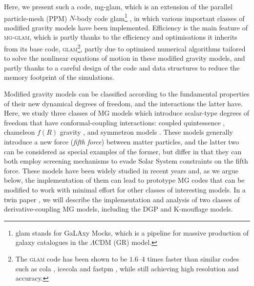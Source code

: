 Here, we present such a code, {\sc mg-glam}, which is an extension of the parallel particle-mesh (PPM) $N$-body code {\sc glam}\footnote{{\sc glam} stands for GaLAxy Mocks, which is a pipeline for massive production of galaxy catalogues in the $\Lambda$CDM (GR) model.} \citep{Klypin:2017iwu}, in which various important classes of modified gravity models have been implemented. Efficiency is the main feature of \textsc{mg-glam}, which is partly thanks to the efficiency and optimisations it inherits from its base code,  \textsc{glam}\footnote{The \textsc{glam} code has been shown to be $1.6$--$4$ times faster than similar codes such as {\sc cola} \cite{Koda_15}, {\sc icecola} \cite{Izard_15} and {\sc fastpm} \cite{Feng_16}, while still achieving high resolution and accuracy.}, partly due to optimised numerical algorithms tailored to solve the nonlinear equations of motion in these modified gravity models, and partly thanks to a careful design of the code and data structures to reduce the memory footprint of the simulations.

Modified gravity models can be classified according to the fundamental properties of their new dynamical degrees of freedom, and the interactions the latter have. Here, we study three classes of MG models which introduce scalar-type degrees of freedom that have conformal-coupling interactions: coupled quintessence \cite{Amendola:1999er}, chameleon \cite{Khoury:2003aq,Khoury:2003rn} $f(R)$ gravity \citep{Hu:2007nk}, and symmetron models \citep{Hinterbichler:2010es,Hinterbichler:2011ca}. These models generally introduce a new force (\textit{fifth force}) between matter particles, and the latter two can be considered as special examples of the former, but differ in that they can both employ screening  mechanisms to evade Solar System constraints on the fifth force. These models have been widely studied in recent years and, as we argue below, the implementation of them can lead to prototype MG codes that can be modified to work with minimal effort for other classes of interesting models. %
In a twin paper \citep{Hernandez-Aguayo:2021_twin_paper}, we will describe the implementation and analysis of two classes of derivative-coupling MG models, including the DGP and K-mouflage models.

